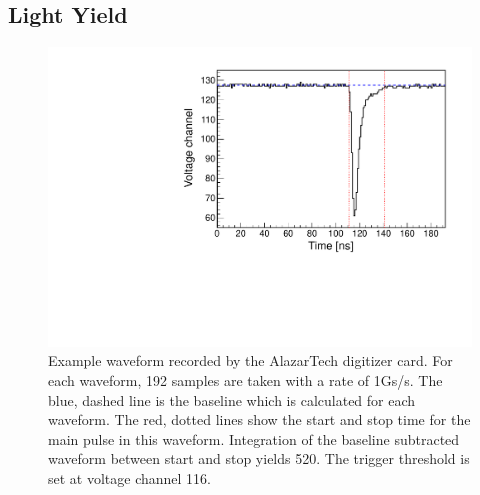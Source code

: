 \documentclass{JINST}
\begin{document}
\subsection{Light Yield}\label{ly_analysis_sec}
\begin{figure}[tbh]
        \begin{center}
        \includegraphics[scale=0.6] {graphs/14August2013_toluene_5gL_PPO_processed_waveform_paper.pdf}
\caption[]{Example waveform recorded by the AlazarTech digitizer card. For each waveform, 192 samples are taken with a rate of 1Gs/s. The blue, dashed line is the baseline which is calculated for each waveform. The red, dotted lines show the start and stop time for the main pulse in this waveform. Integration of the baseline subtracted waveform between start and stop yields 520. The trigger threshold is set at voltage channel 116. \label{waveform_fig}}
\end{center}
\end{figure}
\end{document}
